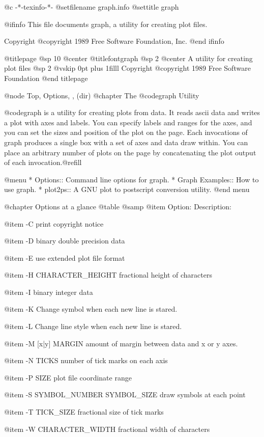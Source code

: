    @c -*-texinfo-*-
@setfilename graph.info
@settitle graph

@ifinfo
This file documents graph, a utility for creating plot files.

Copyright @copyright{} 1989 Free Software Foundation, Inc.
@end ifinfo

@titlepage
@sp 10
@center @titlefont{graph}
@sp 2
@center A utility for creating plot files
@sp 2
@vskip 0pt plus 1filll
Copyright @copyright{} 1989 Free Software Foundation
@end titlepage

@node Top, Options, , (dir)
@chapter The @code{graph} Utility

@code{graph} is a utility for creating plots from data.  It reads ascii
data and writes a plot with axes and labels.  You can specify labels and
ranges for the axes, and you can set the sizes and position of the plot
on the page.  Each invocations of graph produces a single box with a set
of axes and data draw within.  You can place an arbitrary number of
plots on the page by concatenating the plot output of each
invocation.@refill

@menu
* Options::	     Command line options for graph.
* Graph Examples::   How to use graph.
* plot2ps::          A GNU plot to postscript conversion utility.
@end menu

@chapter Options at a glance
@table @samp
@item Option:
Description:

@item -C
print copyright notice

@item -D
binary double precision data

@item -E
use extended plot file format

@item -H CHARACTER_HEIGHT
fractional height of characters

@item -I
binary integer data

@item -K
Change symbol when each new line is stared.

@item -L
Change line style when each new line is stared.

@item -M [x|y] MARGIN
amount of margin between data and x or y axes.

@item -N TICKS
number of tick marks on each axis

@item -P SIZE
plot file coordinate range

@item -S SYMBOL_NUMBER SYMBOL_SIZE
draw symbols at each point

@item -T TICK_SIZE
fractional size of tick marks

@item -W CHARACTER_WIDTH
fractional width of characters

